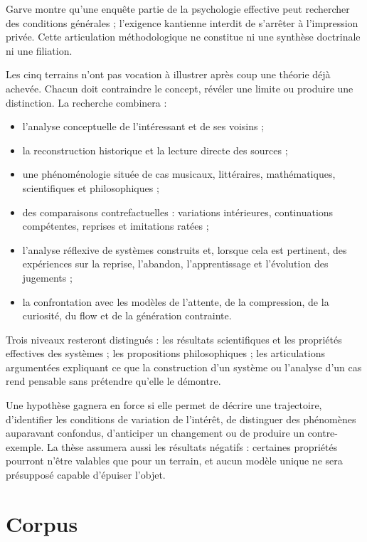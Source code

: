 \documentclass[11pt,a4paper]{article}
\begin{document}
Garve montre qu'une enquête partie de la psychologie effective peut rechercher
des conditions générales ; l'exigence kantienne interdit de s'arrêter à
l'impression privée. Cette articulation méthodologique ne constitue ni une
synthèse doctrinale ni une filiation.

Les cinq terrains n'ont pas vocation à illustrer après coup une théorie déjà
achevée. Chacun doit contraindre le concept, révéler une limite ou produire une
distinction. La recherche combinera :

\begin{itemize}
  \item l'analyse conceptuelle de l'intéressant et de ses voisins ;
  \item la reconstruction historique et la lecture directe des sources ;
  \item une phénoménologie située de cas musicaux, littéraires, mathématiques,
        scientifiques et philosophiques ;
  \item des comparaisons contrefactuelles : variations intérieures,
        continuations compétentes, reprises et imitations ratées ;
  \item l'analyse réflexive de systèmes construits et, lorsque cela est
        pertinent, des expériences sur la reprise, l'abandon, l'apprentissage
        et l'évolution des jugements ;
  \item la confrontation avec les modèles de l'attente, de la compression, de
        la curiosité, du flow et de la génération contrainte.
\end{itemize}

Trois niveaux resteront distingués : les résultats scientifiques et les
propriétés effectives des systèmes ; les propositions philosophiques ; les
articulations argumentées expliquant ce que la construction d'un système ou
l'analyse d'un cas rend pensable sans prétendre qu'elle le démontre.

Une hypothèse gagnera en force si elle permet de décrire une trajectoire,
d'identifier les conditions de variation de l'intérêt, de distinguer des
phénomènes auparavant confondus, d'anticiper un changement ou de produire un
contre-exemple. La thèse assumera aussi les résultats négatifs : certaines
propriétés pourront n'être valables que pour un terrain, et aucun modèle unique
ne sera présupposé capable d'épuiser l'objet.

\section{Corpus}
\end{document}
